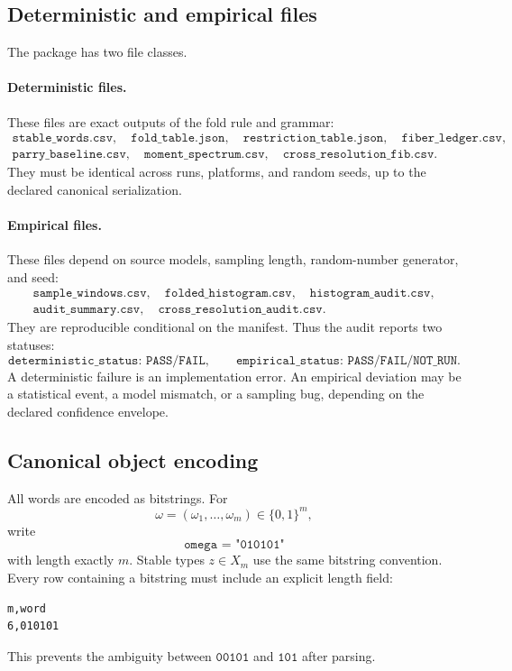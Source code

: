 \subsection{Deterministic and empirical files}

The package has two file classes.

\paragraph{Deterministic files.}
These files are exact outputs of the fold rule and grammar:
\[
\begin{gathered}
\texttt{stable\_words.csv},\quad
\texttt{fold\_table.json},\quad
\texttt{restriction\_table.json},\quad
\texttt{fiber\_ledger.csv},\\
\texttt{parry\_baseline.csv},\quad
\texttt{moment\_spectrum.csv},\quad
\texttt{cross\_resolution\_fib.csv}.
\end{gathered}
\]
They must be identical across runs, platforms, and random seeds, up to the declared canonical serialization.

\paragraph{Empirical files.}
These files depend on source models, sampling length, random-number generator, and seed:
\[
\begin{gathered}
\texttt{sample\_windows.csv},\quad
\texttt{folded\_histogram.csv},\quad
\texttt{histogram\_audit.csv},\\
\texttt{audit\_summary.csv},\quad
\texttt{cross\_resolution\_audit.csv}.
\end{gathered}
\]
They are reproducible conditional on the manifest.  Thus the audit reports two statuses:
\[
\texttt{deterministic\_status: PASS/FAIL},
\qquad
\texttt{empirical\_status: PASS/FAIL/NOT\_RUN}.
\]
A deterministic failure is an implementation error.  An empirical deviation may be a statistical event, a model mismatch, or a sampling bug, depending on the declared confidence envelope.

\subsection{Canonical object encoding}

All words are encoded as bitstrings.  For
\[
\omega=(\omega_1,\ldots,\omega_m)\in\{0,1\}^m,
\]
write
\[
\texttt{omega = "010101"}
\]
with length exactly \(m\).  Stable types \(z\in X_m\) use the same bitstring convention.  Every row containing a bitstring must include an explicit length field:
\begin{verbatim}
m,word
6,010101
\end{verbatim}
This prevents the ambiguity between \(\texttt{00101}\) and \(\texttt{101}\) after parsing.

